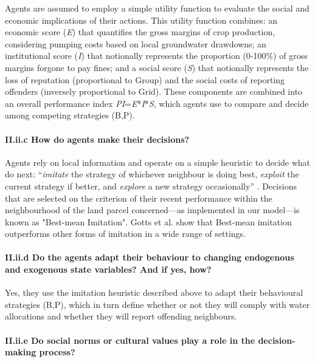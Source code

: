 \documentclass[12pt, a4paper]{article}
\begin{document}
Agents are assumed to employ a simple utility function to evaluate the social and economic implications of their actions. This utility function combines: an economic score (\emph{E}) that quantifies the gross margins of crop production, considering pumping costs based on local groundwater drawdowns; an institutional score (\emph{I}) that notionally represents the proportion (0-100\%) of gross margins forgone to pay fines; and a social score (\emph{S}) that notionally represents the loss of reputation (proportional to Group) and the social costs of reporting offenders (inversely proportional to Grid). These components are combined into an overall performance index \emph{PI}=\emph{E}*\emph{I}*\emph{S}, which agents use to compare and decide among competing strategies (B,P).

\paragraph{II.ii.c How do agents make their decisions?}

Agents rely on local information and operate on a simple heuristic to decide what do next: ``\emph{imitate} the strategy of whichever neighbour is doing best, \emph{exploit} the current strategy if better, and \emph{explore} a new strategy occasionally'' \autocite{Gigerenzer:2002tn}. Decisions that are selected on the criterion of their recent performance within the neighbourhood of the land parcel concerned---as implemented in our model---is known as "Best-mean Imitation". Gotts et al. \autocite{Gotts:2009td} show that Best-mean imitation outperforms other forms of imitation in a wide range of settings.

\paragraph{II.ii.d Do the agents adapt their behaviour to changing endogenous and exogenous state variables? And if yes, how?}

Yes, they use the imitation heuristic described above to adapt their behavioural strategies (B,P), which in turn define whether or not they will comply with water allocations and whether they will report offending neighbours.

\paragraph{II.ii.e Do social norms or cultural values play a role in the decision-making process?}
\end{document}

